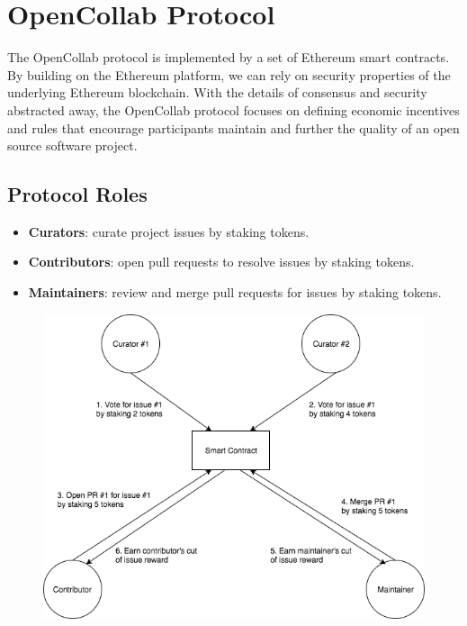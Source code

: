 \section{OpenCollab Protocol}
\label{sec:opencollab}

The OpenCollab protocol is implemented by a set of Ethereum smart contracts. By
building on the Ethereum platform, we can rely on security properties of the
underlying Ethereum blockchain. With the details of consensus and security
abstracted away, the OpenCollab protocol focuses on defining economic incentives
and rules that encourage participants maintain and further the quality of an open
source software project.

\subsection{Protocol Roles}

\begin{itemize}
  \item \textbf{Curators}: curate project issues by staking tokens.
  \item \textbf{Contributors}: open pull requests to resolve issues by staking tokens.
  \item \textbf{Maintainers}: review and merge pull requests for issues by
    staking tokens.
\end{itemize}

\begin{figure}[]
  \includegraphics[width=\linewidth,height=\textheight,keepaspectratio]{figures/devflow.png}
  \centering
\end{figure}

